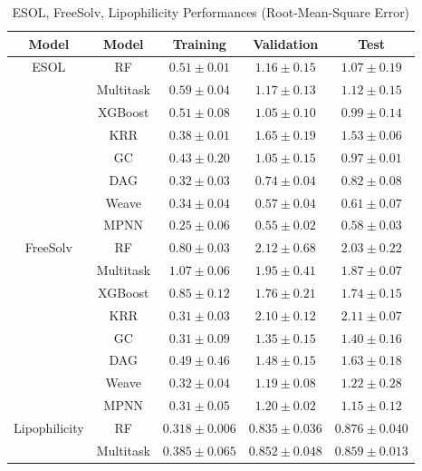 \begin{table}[H]
    \small
    \centering
    \caption{ESOL, FreeSolv, Lipophilicity Performances (Root-Mean-Square Error)}
    \begin{tabular}{ |c|c|c|c|c| } 
    \hline
    \textbf{Model} & \textbf{Model} & \textbf{Training} & \textbf{Validation} & \textbf{Test} \\
    \hline
    \hline    
    \multirow{8}{*}{ESOL}
    & RF & $0.51\pm0.01$ & $1.16\pm0.15$ & $1.07\pm0.19$ \\\cline{2-5}
    & Multitask & $0.59\pm0.04$ & $1.17\pm0.13$ & $1.12\pm0.15$ \\\cline{2-5}
    & XGBoost & $0.51\pm0.08$ & $1.05\pm0.10$ & $0.99\pm0.14$ \\\cline{2-5}
    & KRR & $0.38\pm0.01$ & $1.65\pm0.19$ & $1.53\pm0.06$ \\\cline{2-5}
    & GC & $0.43\pm0.20$ & $1.05\pm0.15$ & $0.97\pm0.01$ \\\cline{2-5}
    & DAG & $0.32\pm0.03$ & $0.74\pm0.04$ & $0.82\pm0.08$ \\\cline{2-5}
    & Weave & $0.34\pm0.04$ & $0.57\pm0.04$ & $0.61\pm0.07$ \\\cline{2-5}
    & MPNN & $0.25\pm0.06$ & $\mathbf{0.55\pm0.02}$ & $\mathbf{0.58\pm0.03}$ \\\cline{2-5}
    \hline
    \hline    
    \multirow{8}{*}{FreeSolv}
    & RF & $0.80\pm0.03$ & $2.12\pm0.68$ & $2.03\pm0.22$ \\\cline{2-5}
    & Multitask & $1.07\pm0.06$ & $1.95\pm0.41$ & $1.87\pm0.07$ \\\cline{2-5}
    & XGBoost & $0.85\pm0.12$ & $1.76\pm0.21$ & $1.74\pm0.15$ \\\cline{2-5}
    & KRR & $0.31\pm0.03$ & $2.10\pm0.12$ & $2.11\pm0.07$ \\\cline{2-5}
    & GC & $0.31\pm0.09$ & $1.35\pm0.15$ & $1.40\pm0.16$ \\\cline{2-5}
    & DAG & $0.49\pm0.46$ & $1.48\pm0.15$ & $1.63\pm0.18$ \\\cline{2-5}
    & Weave & $0.32\pm0.04$ & $\mathbf{1.19\pm0.08}$ & $1.22\pm0.28$ \\\cline{2-5}
    & MPNN & $0.31\pm0.05$ & $1.20\pm0.02$ & $\mathbf{1.15\pm0.12}$ \\\cline{2-5}
    \hline
    \hline    
    \multirow{8}{*}{Lipophilicity}
    & RF & $0.318\pm0.006$ & $0.835\pm0.036$ & $0.876\pm0.040$ \\\cline{2-5}
    & Multitask & $0.385\pm0.065$ & $0.852\pm0.048$ & $0.859\pm0.013$ \\\cline{2-5}

\end{tabular}
\end{table}
